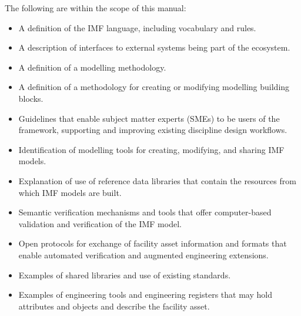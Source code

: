 \documentclass[../main.tex]{subfiles}
\begin{document}

The following are within the scope of this manual:
\begin{itemize}
    \item A definition of the IMF language, including vocabulary and rules.
    \item A description of interfaces to external systems being part of the ecosystem.
    \item A definition of a modelling methodology.
    \item A definition of a methodology for creating or modifying modelling building blocks.
    \item Guidelines that enable subject matter experts (SMEs) to be users of the framework, supporting and improving existing discipline design workflows.
    \item Identification of modelling tools for creating, modifying, and sharing IMF models. 
    \item Explanation of use of reference data libraries that contain the resources from which IMF models are built. 
    \item Semantic verification mechanisms and tools that offer computer-based validation and verification of the IMF model.
    \item Open protocols for exchange of facility asset information and formats that enable automated verification and augmented engineering extensions.
    \item Examples of shared libraries and use of existing standards.
    \item Examples of engineering tools and engineering registers that may hold attributes and objects and describe the facility asset.
\end{itemize}




\end{document}
